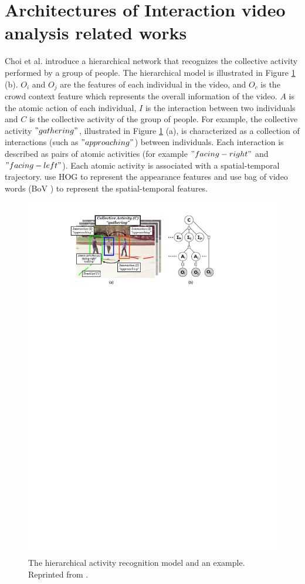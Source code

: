 \section{Architectures of Interaction video analysis related works}
\label{2_1}
Choi et al. \cite{choi2012} introduce a hierarchical network that recognizes the collective activity performed by a group of people. The hierarchical model is illustrated in Figure \ref{fig:hierA} (b). \(O_i\) and \(O_j\) are the features of each individual in the video, and \(O_c\) is the crowd context feature which represents the overall information of the video. \(A\) is the atomic action of each individual, \(I\) is the interaction between two individuals and \(C\) is the collective activity of the group of people. For example, the collective activity \("gathering"\), illustrated in Figure \ref{fig:hierA} (a), is characterized as a collection of interactions (such as \("approaching"\)) between individuals. Each interaction is described as pairs of atomic activities (for example \("facing-right"\) and \("facing-left"\)). Each atomic activity is associated with a spatial-temporal trajectory. \cite{choi2012} use HOG to represent the appearance features and use bag of video words (BoV \cite{bov}) to represent the spatial-temporal features.
\begin{figure}
	\includegraphics[trim=2cm 22.5cm 0cm 1cm]{figs/hier.pdf}
	\caption{The hierarchical activity recognition model and an example. Reprinted from \cite{choi2012}.}
	\label{fig:hierA}
\end{figure}
